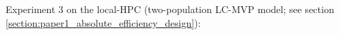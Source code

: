 \begin{table}[H]
{{%
Experiment 3 on the local-HPC (two-population LC-MVP model;
see section \ref{section:paper1_absolute_efficiency_design}):
}}
\end{table}
